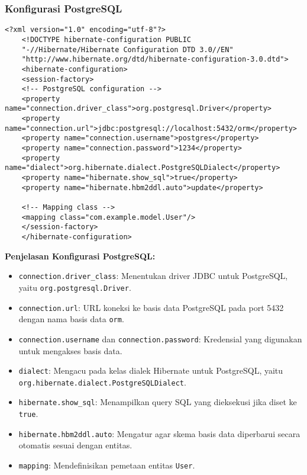 \subsubsection*{Konfigurasi PostgreSQL}
\begin{lstlisting}[style=XmlStyle]
	<?xml version="1.0" encoding="utf-8"?>
	<!DOCTYPE hibernate-configuration PUBLIC 
	"-//Hibernate/Hibernate Configuration DTD 3.0//EN"
	"http://www.hibernate.org/dtd/hibernate-configuration-3.0.dtd">
	<hibernate-configuration>
	<session-factory>
	<!-- PostgreSQL configuration -->
	<property name="connection.driver_class">org.postgresql.Driver</property>
	<property name="connection.url">jdbc:postgresql://localhost:5432/orm</property>
	<property name="connection.username">postgres</property>
	<property name="connection.password">1234</property>
	<property name="dialect">org.hibernate.dialect.PostgreSQLDialect</property>
	<property name="hibernate.show_sql">true</property>
	<property name="hibernate.hbm2ddl.auto">update</property>
	
	<!-- Mapping class -->
	<mapping class="com.example.model.User"/>
	</session-factory>
	</hibernate-configuration>
\end{lstlisting}

\textbf{Penjelasan Konfigurasi PostgreSQL:}
\begin{itemize}
	\item \texttt{connection.driver\_class}: Menentukan driver JDBC untuk PostgreSQL, yaitu \texttt{org.\-postgresql.\-Driver}.
	\item \texttt{connection.url}: URL koneksi ke basis data PostgreSQL pada port 5432 dengan nama basis data \texttt{orm}.
	\item \texttt{connection.username} dan \texttt{connection.password}: Kredensial yang digunakan untuk mengakses basis data.
	\item \texttt{dialect}: Mengacu pada kelas dialek Hibernate untuk PostgreSQL, yaitu \texttt{org.hibernate.\-dialect.\-PostgreSQLDialect}.
	\item \texttt{hibernate.show\_sql}: Menampilkan query SQL yang dieksekusi jika diset ke \texttt{true}.
	\item \texttt{hibernate.hbm2ddl.auto}: Mengatur agar skema basis data diperbarui secara otomatis sesuai dengan entitas.
	\item \texttt{mapping}: Mendefinisikan pemetaan entitas \texttt{User}.
\end{itemize}

